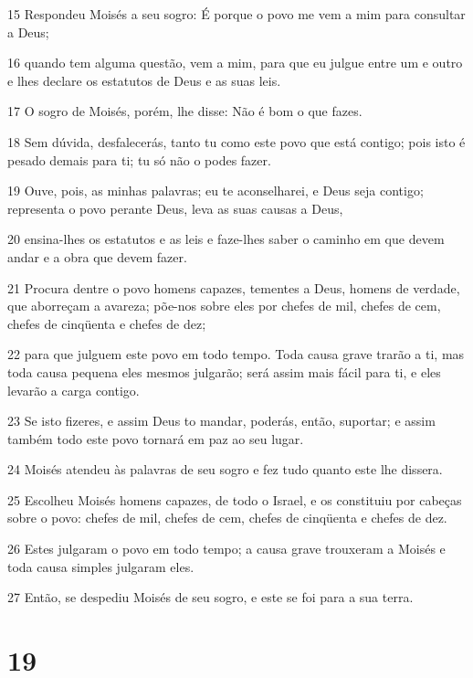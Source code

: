 \par 15 Respondeu Moisés a seu sogro: É porque o povo me vem a mim para consultar a Deus;
\par 16 quando tem alguma questão, vem a mim, para que eu julgue entre um e outro e lhes declare os estatutos de Deus e as suas leis.
\par 17 O sogro de Moisés, porém, lhe disse: Não é bom o que fazes.
\par 18 Sem dúvida, desfalecerás, tanto tu como este povo que está contigo; pois isto é pesado demais para ti; tu só não o podes fazer.
\par 19 Ouve, pois, as minhas palavras; eu te aconselharei, e Deus seja contigo; representa o povo perante Deus, leva as suas causas a Deus,
\par 20 ensina-lhes os estatutos e as leis e faze-lhes saber o caminho em que devem andar e a obra que devem fazer.
\par 21 Procura dentre o povo homens capazes, tementes a Deus, homens de verdade, que aborreçam a avareza; põe-nos sobre eles por chefes de mil, chefes de cem, chefes de cinqüenta e chefes de dez;
\par 22 para que julguem este povo em todo tempo. Toda causa grave trarão a ti, mas toda causa pequena eles mesmos julgarão; será assim mais fácil para ti, e eles levarão a carga contigo.
\par 23 Se isto fizeres, e assim Deus to mandar, poderás, então, suportar; e assim também todo este povo tornará em paz ao seu lugar.
\par 24 Moisés atendeu às palavras de seu sogro e fez tudo quanto este lhe dissera.
\par 25 Escolheu Moisés homens capazes, de todo o Israel, e os constituiu por cabeças sobre o povo: chefes de mil, chefes de cem, chefes de cinqüenta e chefes de dez.
\par 26 Estes julgaram o povo em todo tempo; a causa grave trouxeram a Moisés e toda causa simples julgaram eles.
\par 27 Então, se despediu Moisés de seu sogro, e este se foi para a sua terra.

\chapter{19}

